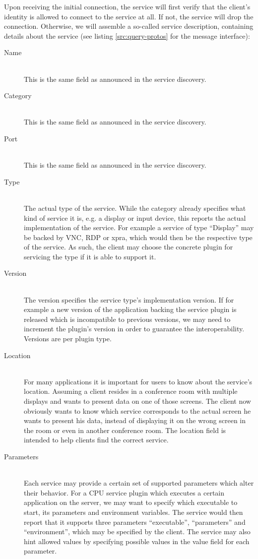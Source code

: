 Upon receiving the initial connection, the service will first verify that the client's identity is allowed to connect to the service at all.
If not, the service will drop the connection.
Otherwise, we will assemble a so-called service description, containing details about the service (see listing \ref{src:query-protos} for the message interface):
\begin{description}
    \item[Name]\hfill\\
        This is the same field as announced in the service discovery.
    \item[Category]\hfill\\
        This is the same field as announced in the service discovery.
    \item[Port]\hfill\\
        This is the same field as announced in the service discovery.
    \item[Type]\hfill\\
        The actual type of the service.
        While the category already specifies what kind of service it is, e.g. a display or input device, this reports the actual implementation of the service.
        For example a service of type ``Display'' may be backed by VNC, RDP or xpra, which would then be the respective type of the service.
        As such, the client may choose the concrete plugin for servicing the type if it is able to support it.
    \item[Version]\hfill\\
        The version specifies the service type's implementation version.
        If for example a new version of the application backing the service plugin is released which is incompatible to previous versions, we may need to increment the plugin's version in order to guarantee the interoperability.
        Versions are per plugin type.
    \item[Location]\hfill\\
        For many applications it is important for users to know about the service's location.
        Assuming a client resides in a conference room with multiple displays and wants to present data on one of those screens.
        The client now obviously wants to know which service corresponds to the actual screen he wants to present his data, instead of displaying it on the wrong screen in the room or even in another conference room.
        The location field is intended to help clients find the correct service.
    \item[Parameters]\hfill\\
        Each service may provide a certain set of supported parameters which alter their behavior.
        For a CPU service plugin which executes a certain application on the server, we may want to specify which executable to start, its parameters and environment variables.
        The service would then report that it supports three parameters ``executable'', ``parameters'' and ``environment'', which may be specified by the client.
        The service may also hint allowed values by specifying possible values in the value field for each parameter.
\end{description}

